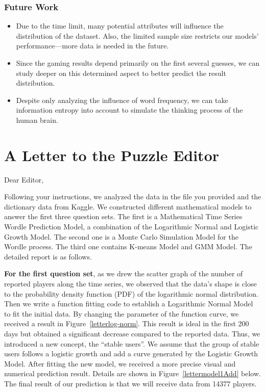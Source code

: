 \documentclass[12pt]{article}
\begin{document}
\subsubsection{Future Work}

\begin{itemize}
    \item {Due to the time limit, many potential attributes will influence the distribution of the dataset. Also, the limited sample size restricts our models' performance—more data is needed in the future. }

    \item {Since the gaming results depend primarily on the first several guesses, we can study deeper on this determined aspect to better predict the result distribution.}

    \item {Despite only analyzing the influence of word frequency, we can take information entropy into account to simulate the thinking process of the human brain.}
\end{itemize}

\clearpage

\section{A Letter to the Puzzle Editor}

Dear Editor,

\vspace{0.1cm}
\noindent
Following your instructions, we analyzed the data in the file you provided and the dictionary data from Kaggle. We constructed different mathematical models to answer the first three question sets. The first is a Mathematical Time Series Wordle Prediction Model, a combination of the Logarithmic Normal and Logistic Growth Model. The second one is a Monte Carlo Simulation Model for the Wordle process. The third one contains K-means Model and GMM Model. The detailed report is as follows.

\vspace{0.1cm}
\noindent
\textbf{For the first question set}, as we drew the scatter graph of the number of reported players along the time series, we observed that the data’s shape is close to the probability density function (PDF) of the logarithmic normal distribution. Then we write a function fitting code to establish a Logarithmic Normal Model to fit the initial data. By changing the parameter of the function curve, we received a result in Figure~\ref{letterlog-norm}. This result is ideal in the first 200 days but obtained a significant decrease compared to the reported data. Thus, we introduced a new concept, the “stable users”. We assume that the group of stable users follows a logistic growth and add a curve generated by the Logistic Growth Model. After fitting the new model, we received a more precise visual and numerical prediction result. Details are shown in Figure~\ref{lettermodel1Add} below. The final result of our prediction is that we will receive data from 14377 players. 
\end{document}
